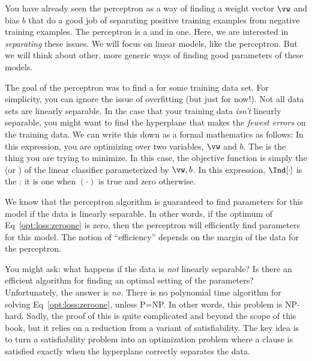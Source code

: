 You have already seen the perceptron as a way of finding a weight
vector $\vw$ and bias $b$ that do a good job of separating positive
training examples from negative training examples.  The perceptron is
a  and  in one.  Here, we are
interested in \emph{separating} these issues.  We will focus on linear
models, like the perceptron.  But we will think about other, more
generic ways of finding good parameters of these models.

The goal of the perceptron was to find a  for some training data set.  For simplicity, you can
ignore the issue of overfitting (but just for now!).  Not all data
sets are linearly separable.  In the case that your training data
\emph{isn't} linearly separable, you might want to find the hyperplane
that makes the \emph{fewest errors} on the training data.  We can
write this down as a formal mathematics 
as follows:
%
%
In this expression, you are optimizing over two variables, $\vw$ and
$b$.  The  is the thing you are trying to
minimize.  In this case, the objective function is simply the
 (or ) of the linear classifier
parameterized by $\vw,b$.  In this expression, $\Ind[\cdot]$ is the
: it is one when $(\cdot)$ is true and
zero otherwise.


We know that the perceptron algorithm is guaranteed to find parameters
for this model if the data is linearly separable.  In other words, if
the optimum of Eq~\eqref{opt:loss:zeroone} is zero, then the
perceptron will efficiently find parameters for this model.  The
notion of ``efficiency'' depends on the margin of the data for the
perceptron.

You might ask: what happens if the data is \emph{not} linearly
separable?  Is there an efficient algorithm for finding an optimal
setting of the parameters?  Unfortunately, the answer is \emph{no.}
There is no polynomial time algorithm for solving
Eq~\eqref{opt:loss:zeroone}, unless P=NP.  In other words, this
problem is NP-hard.  Sadly, the proof of this is quite complicated and
beyond the scope of this book, but it relies on a reduction from a
variant of satisfiability.  The key idea is to turn a satisfiability
problem into an optimization problem where a clause is satisfied
exactly when the hyperplane correctly separates the data.

